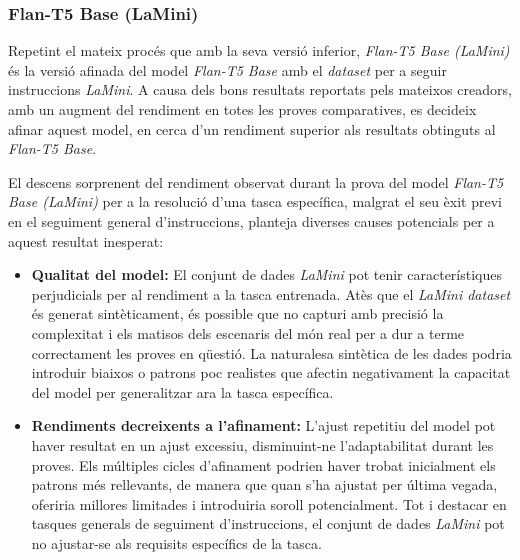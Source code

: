 \subsubsection{Flan-T5 Base (LaMini)}
Repetint el mateix procés que amb la seva versió inferior, \textit{Flan-T5 Base (LaMini)} \cite{flan-t5} \cite{lamini} és la versió afinada del model \textit{Flan-T5 Base} amb el \textit{dataset} per a seguir instruccions \textit{LaMini}. A causa dels bons resultats reportats pels mateixos creadors, amb un augment del rendiment en totes les proves comparatives, es decideix afinar aquest model, en cerca d'un rendiment superior als resultats obtinguts al \textit{Flan-T5 Base}.

El descens sorprenent del rendiment observat durant la prova del model \textit{Flan-T5 Base (LaMini)} per a la resolució d'una tasca específica, malgrat el seu èxit previ en el seguiment general d'instruccions, planteja diverses causes potencials per a aquest resultat inesperat:

\begin{itemize}
  \item \textbf{Qualitat del model:} El conjunt de dades \textit{LaMini} pot tenir característiques perjudicials per al rendiment a la tasca entrenada. Atès que el \textit{LaMini dataset} és generat sintèticament, és possible que no capturi amb precisió la complexitat i els matisos dels escenaris del món real per a dur a terme correctament les proves en qüestió. La naturalesa sintètica de les dades podria introduir biaixos o patrons poc realistes que afectin negativament la capacitat del model per generalitzar ara la tasca específica.
  \item \textbf{Rendiments decreixents a l'afinament:} L'ajust repetitiu del model pot haver resultat en un ajust excessiu, disminuint-ne l'adaptabilitat durant les proves. Els múltiples cicles d'afinament podrien haver trobat inicialment els patrons més rellevants, de manera que quan s'ha ajustat per última vegada, oferiria millores limitades i introduiria soroll potencialment. Tot i destacar en tasques generals de seguiment d'instruccions, el conjunt de dades \textit{LaMini} pot no ajustar-se als requisits específics de la tasca.
\end{itemize}



